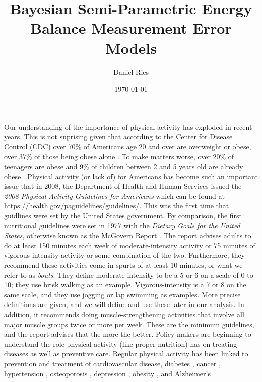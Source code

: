 \documentclass[11pt]{article}\usepackage[]{graphicx}\usepackage[]{color}
\begin{document}
\title{Bayesian Semi-Parametric Energy Balance Measurement Error Models}
\author{Daniel Ries}
\date{\today}
\maketitle

Our understanding of the importance of physical activity has exploded in recent years. This is not suprising given that according to the Center for Disease Control (CDC) over 70\% of Americans age 20 and over are overweight or obese, over 37\% of those being obese alone \cite{obese}. To make matters worse, over 20\% of teenagers are obese and 9\% of children between 2 and 5 years old are already obese \cite{obese}.  Physical activity (or lack of) for Americans has become such an important issue that in 2008, the Department of Health and Human Services issued the \emph{2008 Physical Activity Guidelines for Americans} which can be found at \url{https://health.gov/paguidelines/guidelines/}. This was the first time that guidlines were set by the United States government. By comparison, the first nutritional guidelines were set in 1977 with the \emph{Dietary Goals for the United States}, otherwise known as the McGovern Report \cite{nutrition}. The report advises adults to do at least 150 minutes each week of moderate-intensity activity or 75 minutes of vigorous-intensity activity or some combination of the two. Furthermore, they recommend these activities come in spurts of at least 10 minutes, or what we refer to as \emph{bouts}. They define moderate-intensity to be a 5 or 6 on a scale of 0 to 10; they use brisk walking as an example. Vigorous-intensity is a 7 or 8 on the same scale, and they use jogging or lap swimming as examples. More precise definitions are given, and we will define and use these later in our analysis. In addition, it recommends doing muscle-strengthening activities that involve all major muscle groups twice or more per week. These are the minimum guidelines, and the report advises that the more the better. Policy makers are beginning to understand the role physical activity (like proper nutrition) has on treating diseases as well as preventive care. Regular physical activity has been linked to prevention and treatment of cardiovascular disease\cite{odphp}\cite{warburton}\cite{reiner}, diabetes \cite{odphp}\cite{warburton}\cite{reiner}, cancer \cite{odphp}\cite{warburton}, hypertension \cite{warburton}, osteoporosis \cite{odphp}\cite{warburton}, depression \cite{odphp}\cite{warburton}, obesity \cite{warburton}\cite{reiner}, and Alzheimer's \cite{reiner}.
\end{document}
